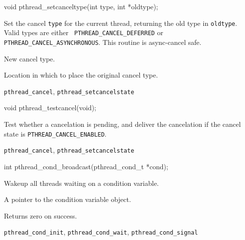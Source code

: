 \begin{apisyn}

	\funcproto void pthread_setcanceltype(int type, int *oldtype);
\end{apisyn}
\begin{apidesc}
	Set the cancel {\tt type} for the current thread, returning the old
	type in {\tt oldtype}. Valid types are either {\tt
	PTHREAD_CANCEL_DEFERRED} or {\tt PTHREAD_CANCEL_ASYNCHRONOUS}.
	This routine is async-cancel safe.
\end{apidesc}
\begin{apiparm}
	\item[type]
		New cancel type.
	\item[oldtype]
		Location in which to place the original cancel type.
\end{apiparm}
\begin{apirel}
	{\tt pthread_cancel}, {\tt pthread_setcancelstate} 
\end{apirel}


\begin{apisyn}

	\funcproto void pthread_testcancel(void);
\end{apisyn}
\begin{apidesc}
	Test whether a cancelation is pending, and deliver the cancelation
	if the cancel state is {\tt PTHREAD_CANCEL_ENABLED}.
\end{apidesc}
\begin{apirel}
	{\tt pthread_cancel}, {\tt pthread_setcancelstate}
\end{apirel}



\begin{apisyn}

	\funcproto int pthread_cond_broadcast(pthread_cond_t *cond);
\end{apisyn}
\begin{apidesc}
	Wakeup all threads waiting on a condition variable.
\end{apidesc}
\begin{apiparm}
	\item[cond]
		A pointer to the condition variable object.
\end{apiparm}
\begin{apiret}
	Returns zero on success.
\end{apiret}
\begin{apirel}
	{\tt pthread_cond_init}, {\tt pthread_cond_wait},
	{\tt pthread_cond_signal}
\end{apirel}


